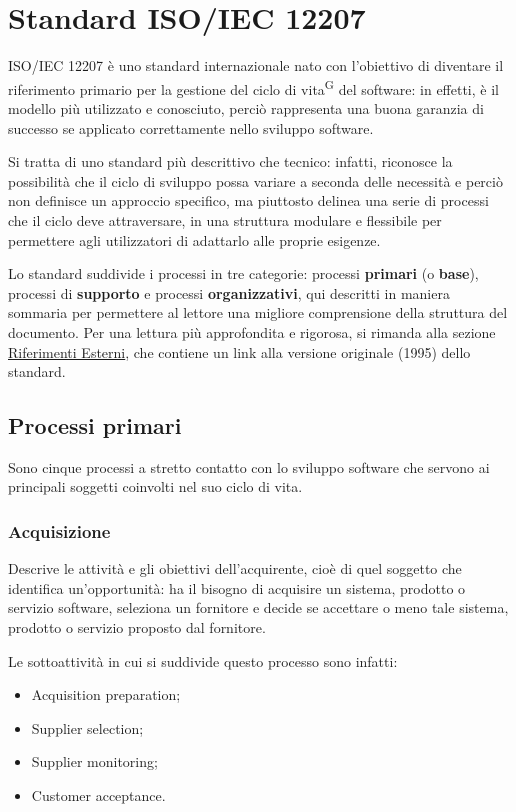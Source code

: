 \newpage
\newpage
\section{Standard ISO/IEC 12207}\label{sec:standard_iso/iec_12207}
ISO/IEC 12207 è uno standard internazionale nato con l'obiettivo di diventare il riferimento primario per la gestione del ciclo di vita\textsuperscript{G} del software: in effetti, è il modello più utilizzato e conosciuto, perciò rappresenta una buona garanzia di successo se applicato correttamente nello sviluppo software.
\par Si tratta di uno standard più descrittivo che tecnico: infatti, riconosce la possibilità che il ciclo di sviluppo possa variare a seconda delle necessità e perciò non definisce un approccio specifico, ma piuttosto delinea una serie di processi che il ciclo deve attraversare, in una struttura modulare e flessibile per permettere agli utilizzatori di adattarlo alle proprie esigenze.
\par Lo standard suddivide i processi in tre categorie: processi \textbf{primari} (o \textbf{base}), processi di \textbf{supporto} e processi \textbf{organizzativi}, qui descritti in maniera sommaria per permettere al lettore una migliore comprensione della struttura del documento. Per una lettura più approfondita e rigorosa, si rimanda alla sezione \hyperref[sec:riferimenti_esterni]{Riferimenti Esterni}, che contiene un link alla versione originale (1995) dello standard.

\subsection{Processi primari}
Sono cinque processi a stretto contatto con lo sviluppo software che servono ai principali soggetti coinvolti nel suo ciclo di vita.
\subsubsection{Acquisizione}
Descrive le attività e gli obiettivi dell'acquirente, cioè di quel soggetto che identifica un'opportunità: ha il bisogno di acquisire un sistema, prodotto o servizio software, seleziona un fornitore e decide se accettare o meno tale sistema, prodotto o servizio proposto dal fornitore.
\par Le sottoattività in cui si suddivide questo processo sono infatti:
\begin{itemize}
    \item Acquisition preparation;
    \item Supplier selection;
    \item Supplier monitoring;
    \item Customer acceptance.
\end{itemize}
